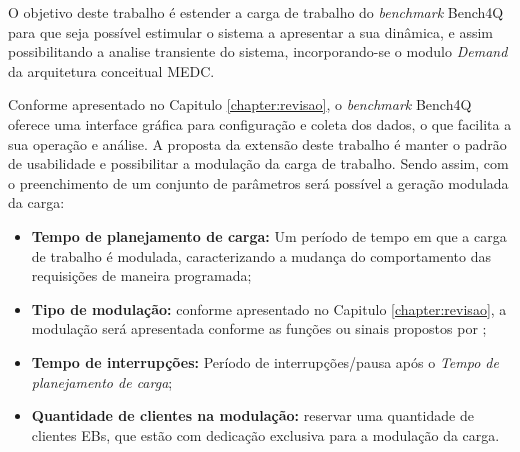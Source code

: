 
O objetivo deste trabalho é estender a carga de trabalho do \textit{benchmark} Bench4Q para que seja possível estimular o sistema a apresentar a sua dinâmica, e assim possibilitando a analise transiente do sistema, incorporando-se o modulo \textit{Demand} da arquitetura conceitual MEDC. 

Conforme apresentado no Capitulo \ref{chapter:revisao}, o \textit{benchmark} Bench4Q oferece uma interface gráfica para configuração e coleta dos dados, o que facilita a sua operação e análise. A proposta da extensão deste trabalho é manter o padrão de usabilidade e possibilitar a modulação da carga de trabalho. Sendo assim, com o preenchimento de um conjunto de parâmetros será possível a geração modulada da carga:
\begin{itemize}
	\item \textbf{Tempo de planejamento de carga:} Um período de tempo em que a carga de trabalho é modulada, caracterizando a mudança do comportamento das requisições de maneira programada;
	
	\item \textbf{Tipo de modulação:} conforme apresentado no Capitulo \ref{chapter:revisao}, a modulação será apresentada conforme as funções ou sinais propostos por ;
	
	\item \textbf{Tempo de interrupções:} Período de interrupções/pausa após o \textit{Tempo de planejamento de carga};
	
	\item \textbf{Quantidade de clientes na modulação:} reservar uma quantidade de clientes EBs, que estão com dedicação exclusiva para a modulação da carga.
\end{itemize}

